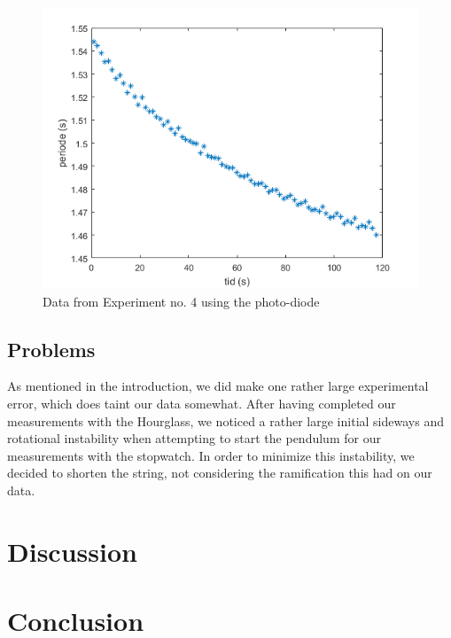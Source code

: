 \documentclass[%
 reprint,
 amsmath,amssymb,
 aps,
]{revtex4-1}
\begin{document}
        \begin{figure}[h!]
        	\center
        	\includegraphics[scale=0.6]{forsok4fig1}
        	\caption{Data from Experiment no. 4 using the photo-diode}
            \label{fig:data4}
        \end{figure}

    \subsection{\label{disc_problems}Problems}
        As mentioned in the introduction, we did make one rather large experimental error, which does taint our data somewhat. After having completed our measurements with the Hourglass, we noticed a rather large initial sideways and rotational instability when attempting to start the pendulum for our measurements with the stopwatch. In order to minimize this instability, we decided to shorten the string, not considering the ramification this had on our data.


\section{Discussion}

 
\section{Conclusion}
	


\end{document}

